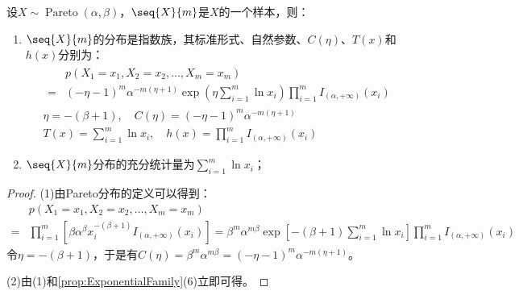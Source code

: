 \begin{theorem}
	设$X\sim\operatorname{Pareto}(\alpha,\beta)$，$\seq{X}{m}$是$X$的一个样本，则：
	\begin{enumerate}
		\item $\seq{X}{m}$的分布是指数族，其标准形式、自然参数、$C(\eta)$、$T(x)$和$h(x)$分别为：
		\begin{gather*}
			\begin{aligned}
				&p(X_1=x_1,X_2=x_2,\dots,X_m=x_m) \\
				=&(-\eta-1)^m\alpha^{-m(\eta+1)}\exp\left(\eta\sum_{i=1}^{m}\ln x_i\right)\prod_{i=1}^{m}I_{(\alpha,+\infty)}(x_i)
			\end{aligned} \\
			\eta=-(\beta+1),\quad C(\eta)=(-\eta-1)^m\alpha^{-m(\eta+1)} \\
			T(x)=\sum_{i=1}^{m}\ln x_i,\quad h(x)=\prod_{i=1}^{m}I_{(\alpha,+\infty)}(x_i)
		\end{gather*}
		\item $\seq{X}{m}$分布的充分统计量为$\sum\limits_{i=1}^{m}\ln x_i$；
	\end{enumerate}
\end{theorem}
\begin{proof}
	(1)由Pareto分布的定义可以得到：
	\begin{align*}
		&p(X_1=x_1,X_2=x_2,\dots,X_m=x_m) \\
		=&\prod_{i=1}^{m}\left[\beta\alpha^{\beta}x_i^{-(\beta+1)}I_{(\alpha,+\infty)}(x_i)\right]=\beta^m\alpha^{m\beta}\exp\left[-(\beta+1)\sum_{i=1}^{m}\ln x_i\right]\prod_{i=1}^{m}I_{(\alpha,+\infty)}(x_i)
	\end{align*}
	令$\eta=-(\beta+1)$，于是有$C(\eta)=\beta^{m}\alpha^{m\beta}=(-\eta-1)^m\alpha^{-m(\eta+1)}$。\par
	(2)由(1)和\cref{prop:ExponentialFamily}(6)立即可得。
\end{proof}

